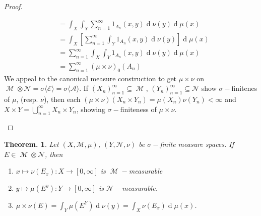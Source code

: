 \documentclass[11pt, a4paper]{memoir}
\theoremstyle{change}
\newtheorem{theorem}{Theorem.}[section]
\theoremstyle{plain}
\theoremstyle{nonumberplain}
\newtheorem{proof}{Proof}
\DeclareMathOperator{\M}{{\mathcal{M}}}
\renewcommand{\d}[1]{\ensuremath{\operatorname{d}\!{#1}}}
\numberwithin{equation}{section}
\begin{document}
\begin{proof}
\begin{enumerate}
\begin{align*}
                                    &= \int_X\int_Y\sum_{n=1}^\infty 1_{A_n}(x,y)\d{\nu(y)}\d{\mu(x)}\\
                                    &= \int_X\left[\sum_{n=1}^\infty\int_Y 1_{A_n}(x,y)\d{\nu(y)}\right]\d{\mu(x)}\\
                                    &= \sum_{n=1}^\infty\int_X\int_Y 1_{A_n}(x,y)\d{\nu(y)}\d{\mu(x)}\\
                                    &= \sum_{n=1}^\infty(\mu\times\nu)_0(A_n)
            \end{align*}
            We appeal to the canonical measure construction to get $\mu\times\nu$ on $\M\otimes\mathcal{N}=\sigma\langle\mathcal{E}\rangle=\sigma\langle\mathcal{A}\rangle$.
            If $(X_n)_{n=1}^\infty\subseteq\M$, $(Y_n)_{n=1}^\infty\subseteq\mathcal{N}$ show $\sigma-$finitenes of $\mu$, (resp. $\nu$), then each $(\mu\times\nu)(X_n\times Y_n)=\mu(X_n)\nu(Y_n)<\infty$ and $X\times Y=\bigcup_{n=1}^\infty X_n\times Y_n$, showing $\sigma-$finiteness of $\mu\times\nu$.
    \end{enumerate}
\end{proof}
\begin{theorem}
    Let $(X,\mathcal{M},\mu)$, $(Y,\mathcal{N},\nu)$ be $\sigma-$finite measure spaces.
    If $E\in\M\otimes\mathcal{N}$, then
    \begin{enumerate}[nolistsep,label=(\roman*)]
        \item $x\mapsto\nu(E_x):X\to[0,\infty]$ is $\M-$measurable
        \item $y\mapsto\mu(E^y):Y\to[0,\infty]$ is $\mathcal{N}-$measurable.
        \item $\mu\times\nu(E)=\int_Y\mu(E^Y)\d{\nu(y)}=\int_X\nu(E_x)\d{\mu(x)}$.
    \end{enumerate}
\end{theorem}
\end{document}
